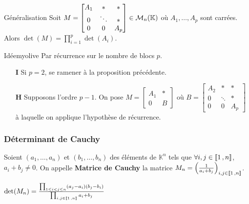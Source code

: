     \begin{prop}{Généralisation}{}
        Soit $M = \begin{bmatrix}
            A_1 & * & * \\
            0 & \ddots & * \\
            0 & 0 & A_p
        \end{bmatrix} \in \mathcal{M}_{n}(\mathbb{K})$ où $A_1, \ldots,A_p$ sont carrées. Alors $\det(M) = \prod_{i = 1}^p \det(A_i)$.
    \end{prop}

    \begin{demo}{Idée}{myolive}
        Par récurrence sur le nombre de blocs $p$.
        \begin{itemize}
            \item[\textbf{I}] \quad Si $p = 2$, se ramener à la proposition précédente.
            \item[\textbf{H}] \quad Supposons l’ordre $p-1$. On pose $M = \begin{bmatrix}
                A_1 & * \\
                0 & B
            \end{bmatrix}$ où $B = \begin{bmatrix}
                A_2 & * & * \\
                0 & \ddots & * \\
                0 & 0 & A_p
            \end{bmatrix}$ à laquelle on applique l’hypothèse de récurrence.
        \end{itemize}
    \end{demo}

    \subsubsection{Déterminant de Cauchy}

    Soient $(a_1,\ldots,a_n)$ et $(b_1,\ldots,b_n)$ des éléments de $\mathbb{K}^n$ tels que $\forall i,j \in \left\llbracket 1 \, , n \right\rrbracket$, $a_i + b_j \neq 0$. On appelle \textbf{Matrice de Cauchy} la matrice $M_n = \left(\frac{1}{a_i + b_j}\right)_{i,j \in \left\llbracket 1 \, , n \right\rrbracket}$.

    \begin{prop}{}{}
        $\det(M_n) = \frac{\prod_{1 \leq i < j \leq n} (a_j - a_i)(b_j - b_i)}{\prod_{i,j \in \left\llbracket 1 \, , n \right\rrbracket} a_i + b_j}$ 
    \end{prop}

